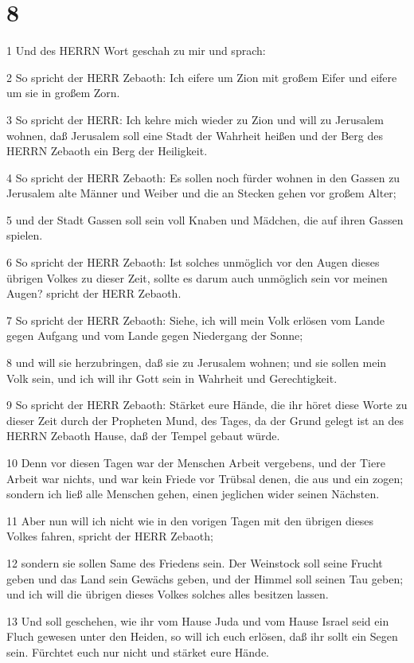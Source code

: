 \chapter{8}

\par 1 Und des HERRN Wort geschah zu mir und sprach:
\par 2 So spricht der HERR Zebaoth: Ich eifere um Zion mit großem Eifer und eifere um sie in großem Zorn.
\par 3 So spricht der HERR: Ich kehre mich wieder zu Zion und will zu Jerusalem wohnen, daß Jerusalem soll eine Stadt der Wahrheit heißen und der Berg des HERRN Zebaoth ein Berg der Heiligkeit.
\par 4 So spricht der HERR Zebaoth: Es sollen noch fürder wohnen in den Gassen zu Jerusalem alte Männer und Weiber und die an Stecken gehen vor großem Alter;
\par 5 und der Stadt Gassen soll sein voll Knaben und Mädchen, die auf ihren Gassen spielen.
\par 6 So spricht der HERR Zebaoth: Ist solches unmöglich vor den Augen dieses übrigen Volkes zu dieser Zeit, sollte es darum auch unmöglich sein vor meinen Augen? spricht der HERR Zebaoth.
\par 7 So spricht der HERR Zebaoth: Siehe, ich will mein Volk erlösen vom Lande gegen Aufgang und vom Lande gegen Niedergang der Sonne;
\par 8 und will sie herzubringen, daß sie zu Jerusalem wohnen; und sie sollen mein Volk sein, und ich will ihr Gott sein in Wahrheit und Gerechtigkeit.
\par 9 So spricht der HERR Zebaoth: Stärket eure Hände, die ihr höret diese Worte zu dieser Zeit durch der Propheten Mund, des Tages, da der Grund gelegt ist an des HERRN Zebaoth Hause, daß der Tempel gebaut würde.
\par 10 Denn vor diesen Tagen war der Menschen Arbeit vergebens, und der Tiere Arbeit war nichts, und war kein Friede vor Trübsal denen, die aus und ein zogen; sondern ich ließ alle Menschen gehen, einen jeglichen wider seinen Nächsten.
\par 11 Aber nun will ich nicht wie in den vorigen Tagen mit den übrigen dieses Volkes fahren, spricht der HERR Zebaoth;
\par 12 sondern sie sollen Same des Friedens sein. Der Weinstock soll seine Frucht geben und das Land sein Gewächs geben, und der Himmel soll seinen Tau geben; und ich will die übrigen dieses Volkes solches alles besitzen lassen.
\par 13 Und soll geschehen, wie ihr vom Hause Juda und vom Hause Israel seid ein Fluch gewesen unter den Heiden, so will ich euch erlösen, daß ihr sollt ein Segen sein. Fürchtet euch nur nicht und stärket eure Hände.
